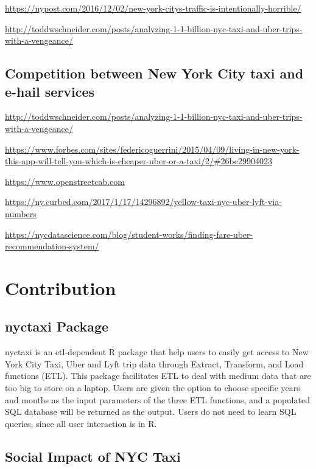 \documentclass[12pt,twoside]{reedthesis}
\theoremstyle{definition}
\theoremstyle{definition}
\theoremstyle{definition}
\theoremstyle{remark}
\begin{document}
\url{https://nypost.com/2016/12/02/new-york-citys-traffic-is-intentionally-horrible/}

\url{http://toddwschneider.com/posts/analyzing-1-1-billion-nyc-taxi-and-uber-trips-with-a-vengeance/}

\subsection{Competition between New York City taxi and e-hail
services}\label{competition-between-new-york-city-taxi-and-e-hail-services}

\url{http://toddwschneider.com/posts/analyzing-1-1-billion-nyc-taxi-and-uber-trips-with-a-vengeance/}

\url{https://www.forbes.com/sites/federicoguerrini/2015/04/09/living-in-new-york-this-app-will-tell-you-which-is-cheaper-uber-or-a-taxi/2/\#26bc29904023}

\url{https://www.openstreetcab.com}

\url{https://ny.curbed.com/2017/1/17/14296892/yellow-taxi-nyc-uber-lyft-via-numbers}

\url{https://nycdatascience.com/blog/student-works/finding-fare-uber-recommendation-system/}

\section{Contribution}\label{contribution}

\subsection{nyctaxi Package}\label{nyctaxi-package}

nyctaxi is an etl-dependent R package that help users to easily get
access to New York City Taxi, Uber and Lyft trip data through Extract,
Transform, and Load functions (ETL). This package facilitates ETL to
deal with medium data that are too big to store on a laptop. Users are
given the option to choose specific years and months as the input
parameters of the three ETL functions, and a populated SQL database will
be returned as the output. Users do not need to learn SQL queries, since
all user interaction is in R.

\subsection{Social Impact of NYC Taxi}\label{social-impact-of-nyc-taxi}
\end{document}
